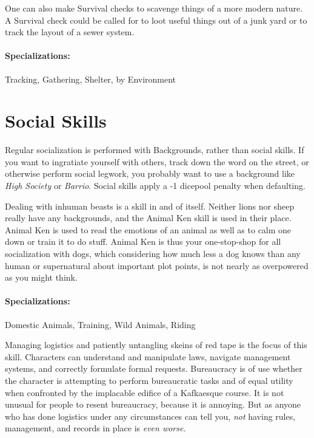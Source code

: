 One can also make Survival checks to scavenge things of a more modern nature. A Survival check could be called for to loot useful things out of a junk yard or to track the layout of a sewer system.

\paragraph{Specializations:} Tracking, Gathering, Shelter, by Environment

\section{Social Skills}

\hspace{\parindent} Regular socialization is performed with Backgrounds, rather than social skills. If you want to ingratiate yourself with others, track down the word on the street, or otherwise perform social legwork, you probably want to use a background like \textit{High Society} or \textit{Barrio}. Social skills apply a -1 dicepool penalty when defaulting.


\hspace{\parindent} Dealing with inhuman beasts is a skill in and of itself. Neither lions nor sheep really have any backgrounds, and the Animal Ken skill is used in their place. Animal Ken is used to read the emotions of an animal as well as to calm one down or train it to do stuff. Animal Ken is thus your one-stop-shop for all socialization with dogs, which considering how much less a dog knows than any human or supernatural about important plot points, is not nearly as overpowered as you might think.

\paragraph{Specializations:} Domestic Animals, Training, Wild Animals, Riding


\hspace{\parindent} Managing logistics and patiently untangling skeins of red tape is the focus of this skill. Characters can understand and manipulate laws, navigate management systems, and correctly formulate formal requests. Bureaucracy is of use whether the character is attempting to perform bureaucratic tasks and of equal utility when confronted by the implacable edifice of a Kafkaesque course. It is not unusual for people to resent bureaucracy, because it is annoying. But as anyone who has done logistics under any circumstances can tell you, \textit{not} having rules, management, and records in place is \textit{even worse}.

